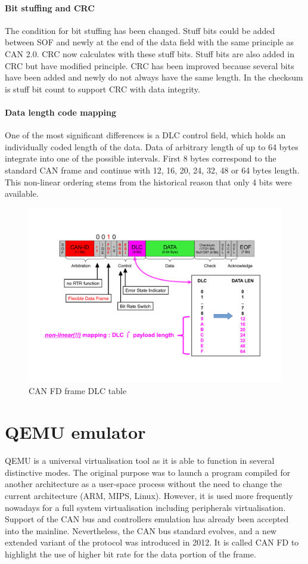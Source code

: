 \documentclass{ctuthesis}
\begin{document}
   \subsubsection{Bit stuffing and CRC}
    The condition for bit stuffing has been changed. Stuff bits could be added between SOF and newly at the end of the data field with the same principle as CAN 2.0. CRC now calculates with these stuff bits. Stuff bits are also added in CRC but have modified principle. CRC has been improved because several bits have been added and newly do not always have the same length. In the checksum is stuff bit count to support CRC with data integrity.
   \subsubsection{Data length code mapping}
    One of the most significant differences is a DLC control field, which holds an individually coded length of the data. Data of arbitrary length of up to 64 bytes integrate into one of the possible intervals. First 8 bytes correspond to the standard CAN frame and continue with 12, 16, 20, 24, 32, 48 or 64 bytes length. This non-linear ordering stems from the historical reason that only 4 bits were available.
    \begin{figure}[H]
    \includegraphics[width=1\textwidth]{agl2017-socketcan-can_fd_dlc}
    \caption{CAN FD frame DLC table \cite{canfd_dlc}}
    \end{figure}
 
\chapter{QEMU emulator}
 QEMU is a universal virtualisation tool as it is able to function in several distinctive modes. The original purpose was to launch a program compiled for another architecture as a user-space process without the need to change the current architecture (ARM, MIPS, Linux). However, it is used more frequently nowadays for a full system virtualisation including peripherals virtualisation. Support of the CAN bus and controllers emulation has already been accepted into the mainline. Nevertheless, the CAN bus standard evolves, and a new extended variant of the protocol was introduced in 2012. It is called CAN FD to highlight the use of higher bit rate for the data portion of the frame.
\end{document}
